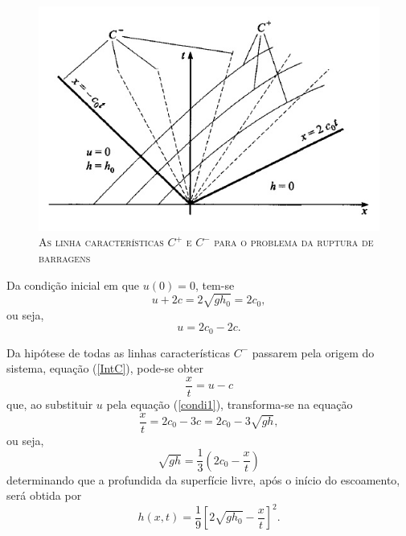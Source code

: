 \begin{figure}[H]
	\centering
	\includegraphics[scale=1]{figuras/220B.jpg}	%
	\caption{\textsc{As linha características $C^+$ e $C^-$ para o problema da ruptura de barragens}}
	\vspace{-0.1cm}
	\label{220B}
\end{figure}

Da condição inicial em que $u(0)=0$, tem-se
\begin{equation} \label{CDini}
u+2c=2 \sqrt{gh_0}= 2c_0,
\end{equation}
ou seja,
\begin{equation} \label{condi1}
u= 2c_0 -2c.
\end{equation}

Da hipótese de todas as linhas características $C^-$ passarem pela origem do sistema, equação (\ref{IntC}), pode-se obter
\begin{equation} \label{caracC}
\frac{x}{t} = u-c
\end{equation}
que, ao substituir $u$ pela equação (\ref{condi1}), transforma-se na equação
\begin{equation} \label{soma}
\frac{x}{t} = 2c_0 - 3c = 2c_0 - 3 \sqrt{gh},
\end{equation}
ou seja,
\begin{equation*}
\sqrt{gh} = \frac{1}{3} \left( 2c_0 - \frac{x}{t} \right)
\end{equation*}
determinando que a profundida da superfície livre, após o início do escoamento, será obtida por
\begin{equation} \label{solzAR}
h(x,t)= \frac{1}{9} \left[2 \sqrt{gh_0} - \frac{x}{t} \right]^2.
\end{equation}

